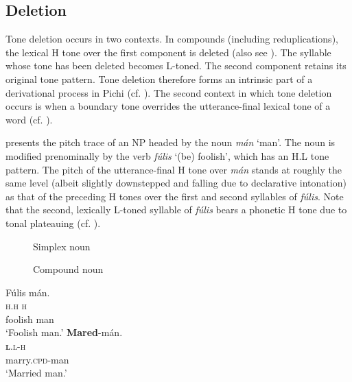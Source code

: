 \subsection{Deletion}\label{sec:3.2.4}

Tone deletion occurs in two contexts. In compounds (including reduplications), the lexical H tone over the first component is deleted (also see \citealt{Yakpo2012}). The syllable whose tone has been deleted becomes L-toned. The second component retains its original tone pattern. Tone deletion therefore forms an intrinsic part of a derivational process in Pichi (cf. ). The second context in which tone deletion occurs is when a boundary tone overrides the utterance-final lexical tone of a word (cf. ).

 presents the pitch trace of an NP headed by the noun \textit{mán} ‘man’. The noun is modified prenominally by the verb \textit{fúlis} ‘(be) foolish’, which has an H.L tone pattern. The pitch of the utterance-final H tone over \textit{mán} stands at roughly the same level (albeit slightly downstepped and falling due to declarative intonation) as that of the preceding H tones over the first and second syllables of \textit{fúlis}. Note that the second, lexically L-toned syllable of \textit{fúlis} bears a phonetic H tone due to tonal plateauing (cf. ).

\begin{figure}
\caption{Simplex noun}
\label{fig:key:3.19}
\end{figure}

\begin{figure}
\caption{Compound noun}
\label{fig:key:3.20}
\end{figure}

\ea\label{ex:key:58}
\glll   Fúlis  mán.\\
\textsc{h.h}    \textsc{h}\\
foolish  man\\
\glt   ‘Foolish man.’ 
\z
\ea\label{ex:key:59}
\glll    \textbf{Mared}{}-mán.\\
\textbf{\textsc{l}}.\textsc{l-h}\\
marry.\textsc{cpd}{}-man\\
\glt ‘Married man.’
\z

